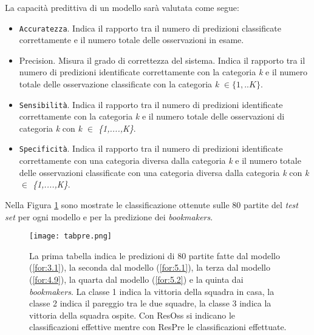 La capacità predittiva di un modello sarà valutata come segue:
\begin{itemize}
	\item \texttt{Accuratezza}. Indica il rapporto tra il numero di predizioni classificate correttamente e il numero totale delle osservazioni in esame.
	\item \textsf{Precision}. Misura il grado di correttezza del sistema. Indica il rapporto tra il numero di predizioni identificate correttamente con la categoria \emph{k} e il numero totale delle osservazione classificate con la categoria \emph{k} $\in \{1,..K\}$.
	\item \texttt{Sensibilità}. Indica il rapporto tra il numero di predizioni identificate correttamente con la categoria \emph{k} e il numero totale delle osservazioni di categoria \emph{k} con \emph{k $\in$ \{1,....,K\}}.
	\item \texttt{Specificità}. Indica il rapporto tra il numero di predizioni identificate correttamente con una categoria diversa dalla categoria \emph{k} e il numero totale delle osservazioni classificate con una categoria diversa dalla categoria \emph{k} con \emph{k $\in$ \{1,....,K\}}.
\end{itemize}
Nella Figura \ref{fig:pre} sono mostrate le classificazione ottenute sulle 80 partite del \emph{test set} per ogni modello e per la predizione dei \emph{bookmakers}.
\begin{figure}[]
	\begin{center}
		\texttt{[image: tabpre.png]}
		\caption{La prima tabella indica le predizioni di 80 partite fatte dal modello (\ref{for:3.1}), la seconda dal modello (\ref{for:5.1}), la terza dal modello (\ref{for:4.9}), la quarta dal modello (\ref{for:5.2}) e la quinta dai \emph{bookmakers}. La classe 1 indica la vittoria della squadra in casa, la classe 2 indica il pareggio tra le due squadre, la classe 3 indica la vittoria della squadra ospite. Con \textsf{ResOss} si indicano le classificazioni effettive mentre con \textsf{ResPre} le classificazioni effettuate.}\label{fig:pre}
	\end{center}
\end{figure}
